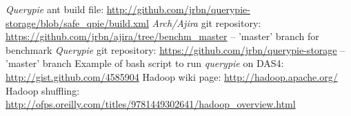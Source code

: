 \begin{thebibliography}{99}
		{\emph{Querypie} ant build file: \url{http://github.com/jrbn/querypie-storage/blob/safe_qpie/build.xml}}
		{\emph{Arch/Ajira} git repository: \url{https://github.com/jrbn/ajira/tree/benchm_master} -- 'master' branch for benchmark}
		{\emph{Querypie} git repository: \url{https://github.com/jrbn/querypie-storage} -- 'master' branch}
		{Example of bash script to run \emph{querypie} on DAS4: \url{http://gist.github.com/4585904}}
		{Hadoop wiki page: \url{http://hadoop.apache.org/}}
		{Hadoop shuffling: \url{http://ofps.oreilly.com/titles/9781449302641/hadoop_overview.html}}
\end{thebibliography}
